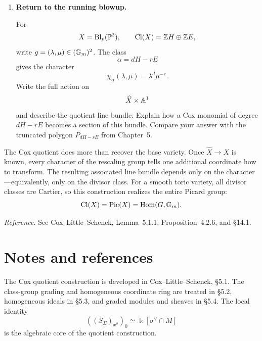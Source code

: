 \begin{enumerate}[label=\textbf{Hint \arabic*.},wide=0pt]
The construction gives a homomorphism
\[
\Phi:\Cl(X)\longrightarrow\Pic(X),
\qquad
\alpha\longmapsto[L_\alpha].
\]
Use the preceding hints to show that \(\Phi\) sends \([D]\) to
\([\mathcal O_X(D)]\). Explain why smoothness implies that every Weil
divisor is Cartier, and conclude that
\[
\boxed{
\Cl(X)\simeq\Pic(X).
}
\]
Where would this argument fail for a singular toric variety?

\item \textbf{Return to the running blowup.}

For
\[
X=\Blp{\PP^2}{p},
\qquad
\Cl(X)=\ZZ H\oplus\ZZ E,
\]
write \(g=(\lambda,\mu)\in(\Gm)^2\). The class
\[
\alpha=dH-rE
\]
gives the character
\[
\chi_\alpha(\lambda,\mu)=\lambda^d\mu^{-r}.
\]
Write the full action on
\[
\widehat X\times\AAA^1
\]
and describe the quotient line bundle. Explain how a Cox monomial of
degree \(dH-rE\) becomes a section of this bundle. Compare your answer
with the truncated polygon \(P_{dH-rE}\) from Chapter~5.

\end{enumerate}

\begin{tcolorbox}[
  colback=PredictionTeal!5,
  colframe=PredictionTeal,
  title={The lesson of the construction},
  fonttitle=\bfseries
]
The Cox quotient does more than recover the base variety. Once
\(\widehat X\to X\) is known, every character of the rescaling group
tells one additional coordinate how to transform. The resulting
associated line bundle depends only on the character---equivalently,
only on the divisor class. For a smooth toric variety, all divisor
classes are Cartier, so this construction realizes the entire Picard
group:
\[
\Cl(X)=\Pic(X)=\Hom(G,\Gm).
\]
\end{tcolorbox}

\noindent
\textit{Reference.}
See Cox--Little--Schenck, Lemma~5.1.1, Proposition~4.2.6, and
\S14.1.

\clearpage
\section*{Notes and references}

The Cox quotient construction is developed in Cox--Little--Schenck,
\S5.1. The class-group grading and homogeneous coordinate ring are
treated in \S5.2, homogeneous ideals in \S5.3, and graded modules and
sheaves in \S5.4. The local identity
\[
\left((S_\Sigma)_{x^{\widehat\sigma}}\right)_0
\simeq
\Bbbk[\sigma^\vee\cap M]
\]
is the algebraic core of the quotient construction.

